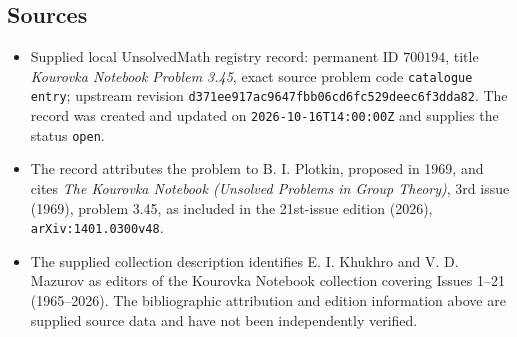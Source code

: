 \documentclass[11pt]{article}
\begin{document}
\subsection{Sources}
\begin{itemize}
\item Supplied local UnsolvedMath registry record: permanent ID \(700194\), title \emph{Kourovka Notebook Problem 3.45}, exact source problem code \texttt{catalogue entry}; upstream revision \texttt{d371ee917ac9647fbb06cd6fc529deec6f3dda82}. The record was created and updated on \texttt{2026-10-16T14:00:00Z} and supplies the status \texttt{open}.
\item The record attributes the problem to B. I. Plotkin, proposed in 1969, and cites \emph{The Kourovka Notebook (Unsolved Problems in Group Theory)}, 3rd issue (1969), problem 3.45, as included in the 21st-issue edition (2026), \texttt{arXiv:1401.0300v48}.
\item The supplied collection description identifies E. I. Khukhro and V. D. Mazurov as editors of the Kourovka Notebook collection covering Issues 1--21 (1965--2026). The bibliographic attribution and edition information above are supplied source data and have not been independently verified.
\end{itemize}
\end{document}
